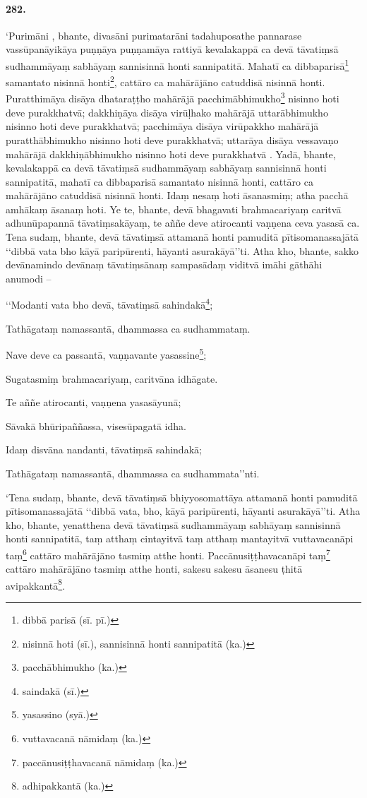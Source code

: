 \paragraph{282.} ‘Purimāni , bhante, divasāni purimatarāni tadahuposathe pannarase vassūpanāyikāya puṇṇāya puṇṇamāya rattiyā kevalakappā ca devā tāvatiṃsā sudhammāyaṃ sabhāyaṃ sannisinnā honti sannipatitā. Mahatī ca dibbaparisā\footnote{dibbā parisā (sī. pī.)} samantato nisinnā honti\footnote{nisinnā hoti (sī.), sannisinnā honti sannipatitā (ka.)}, cattāro ca mahārājāno catuddisā nisinnā honti. Puratthimāya disāya dhataraṭṭho mahārājā pacchimābhimukho\footnote{pacchābhimukho (ka.)} nisinno hoti deve purakkhatvā; dakkhiṇāya disāya virūḷhako mahārājā uttarābhimukho nisinno hoti deve purakkhatvā; pacchimāya disāya virūpakkho mahārājā puratthābhimukho nisinno hoti deve purakkhatvā; uttarāya disāya vessavaṇo mahārājā dakkhiṇābhimukho nisinno hoti deve purakkhatvā . Yadā, bhante, kevalakappā ca devā tāvatiṃsā sudhammāyaṃ sabhāyaṃ sannisinnā honti sannipatitā, mahatī ca dibbaparisā samantato nisinnā honti, cattāro ca mahārājāno catuddisā nisinnā honti. Idaṃ nesaṃ hoti āsanasmiṃ; atha pacchā amhākaṃ āsanaṃ hoti. Ye te, bhante, devā bhagavati brahmacariyaṃ caritvā adhunūpapannā tāvatiṃsakāyaṃ, te aññe deve atirocanti vaṇṇena ceva yasasā ca. Tena sudaṃ, bhante, devā tāvatiṃsā attamanā honti pamuditā pītisomanassajātā ‘‘dibbā vata bho kāyā paripūrenti, hāyanti asurakāyā’’ti. Atha kho, bhante, sakko devānamindo devānaṃ tāvatiṃsānaṃ sampasādaṃ viditvā imāhi gāthāhi anumodi –

‘‘Modanti vata bho devā, tāvatiṃsā sahindakā\footnote{saindakā (sī.)};

Tathāgataṃ namassantā, dhammassa ca sudhammataṃ.

Nave deve ca passantā, vaṇṇavante yasassine\footnote{yasassino (syā.)};

Sugatasmiṃ brahmacariyaṃ, caritvāna idhāgate.

Te aññe atirocanti, vaṇṇena yasasāyunā;

Sāvakā bhūripaññassa, visesūpagatā idha.

Idaṃ disvāna nandanti, tāvatiṃsā sahindakā;

Tathāgataṃ namassantā, dhammassa ca sudhammata’’nti.

‘Tena sudaṃ, bhante, devā tāvatiṃsā bhiyyosomattāya attamanā honti pamuditā pītisomanassajātā ‘‘dibbā vata, bho, kāyā paripūrenti, hāyanti asurakāyā’’ti. Atha kho, bhante, yenatthena devā tāvatiṃsā sudhammāyaṃ sabhāyaṃ sannisinnā honti sannipatitā, taṃ atthaṃ cintayitvā taṃ atthaṃ mantayitvā vuttavacanāpi taṃ\footnote{vuttavacanā nāmidaṃ (ka.)} cattāro mahārājāno tasmiṃ atthe honti. Paccānusiṭṭhavacanāpi taṃ\footnote{paccānusiṭṭhavacanā nāmidaṃ (ka.)} cattāro mahārājāno tasmiṃ atthe honti, sakesu sakesu āsanesu ṭhitā avipakkantā\footnote{adhipakkantā (ka.)}.

